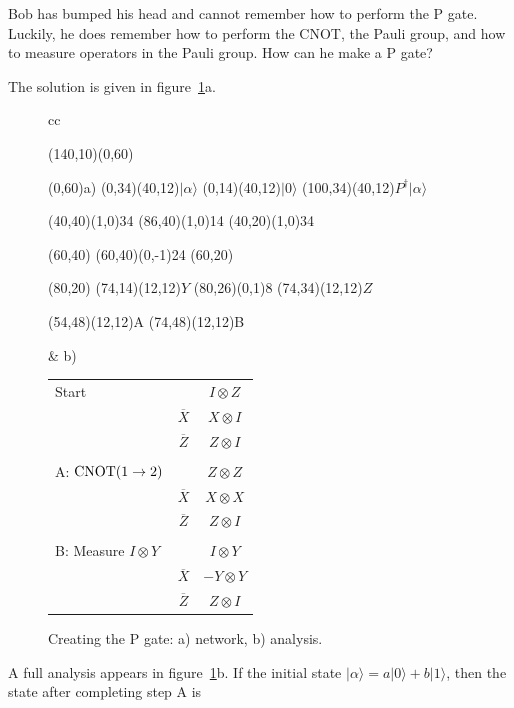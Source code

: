 \begin{example}
Bob has bumped his head and cannot remember how to perform the P
gate.  Luckily, he does remember how to perform the CNOT, the Pauli
group, and how to measure operators in the Pauli group.  How can he
make a P gate?
\end{example}

The solution is given in figure~\ref{fig:Pgate}a.
\begin{figure}
\centering
\begin{tabular}{cc}
\begin{picture}(140,10)(0,60)

\put(0,60){a)}
\put(0,34){\makebox(40,12){$|\alpha\rangle$}}
\put(0,14){\makebox(40,12){$|0\rangle$}}
\put(100,34){\makebox(40,12){$P^\dagger |\alpha\rangle$}}

\put(40,40){\line(1,0){34}}
\put(86,40){\line(1,0){14}}
\put(40,20){\line(1,0){34}}

\put(60,40){}
\put(60,40){\line(0,-1){24}}
\put(60,20){}

\put(80,20){}
\put(74,14){\makebox(12,12){$Y$}}
\put(80,26){\line(0,1){8}}
\put(74,34){\framebox(12,12){$Z$}}

\put(54,48){\makebox(12,12){A}}
\put(74,48){\makebox(12,12){B}}

\end{picture}
& b)
\begin{tabular}[t]{lcc}
Start& & $I \otimes Z$ \\
& $\overline{X}$ & $X \otimes I$ \\
& $\overline{Z}$ & $Z \otimes I$ \\
\\
A: ${\rm CNOT(1 \rightarrow 2)}$ & & $Z \otimes Z$ \\
& $\overline{X}$ & $X \otimes X$ \\
& $\overline{Z}$ & $Z \otimes I$ \\
\\
B: Measure $I \otimes Y$ & & $I \otimes Y$ \\
& $\overline{X}$ & $- Y \otimes Y$ \\
& $\overline{Z}$ & $Z \otimes I$ 
\end{tabular}
\end{tabular}
\caption{Creating the P gate: a) network, b) analysis.}
\label{fig:Pgate}
\end{figure}
A full analysis appears in figure~\ref{fig:Pgate}b.
If the initial state $|\alpha\rangle = a|0\rangle + b|1\rangle$, then
the state after completing step A is
